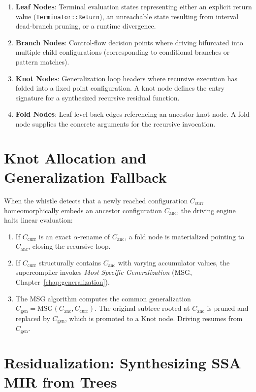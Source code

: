 \begin{enumerate}
    \item \textbf{Leaf Nodes}: Terminal evaluation states representing either an explicit return value (\texttt{Terminator::Return}), an unreachable state resulting from interval dead-branch pruning, or a runtime divergence.
    \item \textbf{Branch Nodes}: Control-flow decision points where driving bifurcated into multiple child configurations (corresponding to conditional branches or pattern matches).
    \item \textbf{Knot Nodes}: Generalization loop headers where recursive execution has folded into a fixed point configuration. A knot node defines the entry signature for a synthesized recursive residual function.
    \item \textbf{Fold Nodes}: Leaf-level back-edges referencing an ancestor knot node. A fold node supplies the concrete arguments for the recursive invocation.
\end{enumerate}

\section{Knot Allocation and Generalization Fallback}
\label{sec:symbolic_state:knots}

When the whistle detects that a newly reached configuration $C_{\text{curr}}$ homeomorphically embeds an ancestor configuration $C_{\text{anc}}$, the driving engine halts linear evaluation:

\begin{enumerate}
    \item If $C_{\text{curr}}$ is an exact $\alpha$-rename of $C_{\text{anc}}$, a fold node is materialized pointing to $C_{\text{anc}}$, closing the recursive loop.
    \item If $C_{\text{curr}}$ structurally contains $C_{\text{anc}}$ with varying accumulator values, the supercompiler invokes \emph{Most Specific Generalization} (MSG, Chapter~\ref{chap:generalization}).
    \item The MSG algorithm computes the common generalization $C_{\text{gen}} = \text{MSG}(C_{\text{anc}}, C_{\text{curr}})$. The original subtree rooted at $C_{\text{anc}}$ is pruned and replaced by $C_{\text{gen}}$, which is promoted to a Knot node. Driving resumes from $C_{\text{gen}}$.
\end{enumerate}

\section{Residualization: Synthesizing SSA MIR from Trees}
\label{sec:symbolic_state:residualize}

